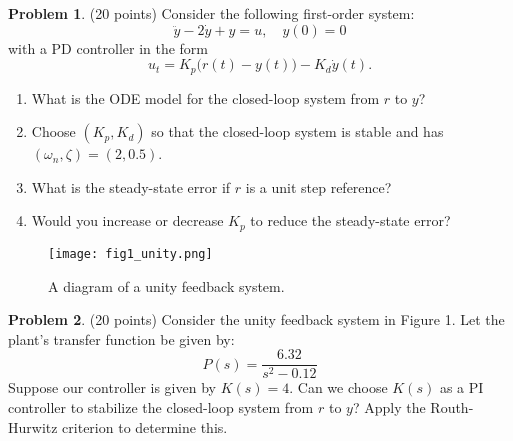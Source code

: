\documentclass[12pt]{article}
\theoremstyle{definition}
\newtheorem{problem}{Problem}
\begin{document}
\begin{problem}
(20 points) Consider the following first-order system:
\[
\ddot{y} - 2\dot{y} + y = u, \quad y(0) = 0
\]
with a PD controller in the form
\[
u_t = K_p \big(r(t) - y(t)\big) - K_d \dot{y}(t).
\]
\begin{enumerate}[label=(\alph*)]
    \item What is the ODE model for the closed-loop system from \( r \) to \( y \)?
    \item Choose \( (K_p, K_d) \) so that the closed-loop system is stable and has \( (\omega_n, \zeta) = (2, 0.5) \).
    \item What is the steady-state error if \( r \) is a unit step reference?
    \item Would you increase or decrease \( K_p \) to reduce the steady-state error?
\end{enumerate}

\begin{figure}[h!]
    \centering
    \texttt{[image: fig1\_unity.png]}
    \caption{A diagram of a unity feedback system.}
\end{figure}
\end{problem}
\begin{problem}
(20 points) Consider the unity feedback system in Figure 1. Let the plant's transfer function be given by:
\[
P(s) = \frac{6.32}{s^2 - 0.12}
\]
Suppose our controller is given by \( K(s) = 4 \). Can we choose \( K(s) \) as a PI controller to stabilize the closed-loop system from \( r \) to \( y \)? Apply the Routh-Hurwitz criterion to determine this.

\end{problem}
\end{document}
